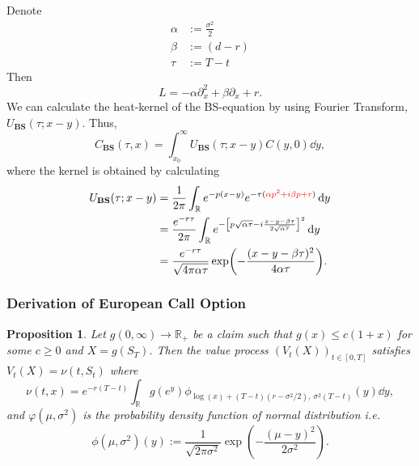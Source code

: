 \documentclass[10pt]{article}
\theoremstyle{remark}
\theoremstyle{plain}
\newtheorem{Proposition}{Proposition}[section]
\newcommand{\R}{\mathbb{R}}
\newcommand{\p}{\partial}
\numberwithin{equation}{section}
\renewcommand{\leq}{\leqslant}
\renewcommand{\geq}{\geqslant}
\begin{document}
Denote
\begin{align*}
	\alpha &:= \frac{\sigma^2}{2} \\
	\beta &:= (d-r)\\
	\tau &:= T-t
\end{align*}
Then
\[
	L = -\alpha \p_x^2 + \beta \p_x + r.
\]
We can calculate the heat-kernel of the BS-equation by using Fourier Transform, $U_{\textbf{BS}}(\tau; x - y)$. Thus, 
\[
C_{\textbf{BS}}(\tau, x) = \int_{x_0}^\infty U_{\textbf{BS}}(\tau; x - y)C(y, 0) \dd{y},
\]
where the kernel is obtained by calculating
\begin{align*}
	U_{\textbf{BS}}(\tau; x - y) &= \frac{1}{2\pi} \int_\R e^{-p(x-y)} e^{-\tau( {\color{red} \alpha p^2 + i\beta p + r} )} \dd{y}
	\\
	& = \frac{e^{-r\tau}}{2\pi} \int_\R e^{- \left[p\sqrt{\alpha \tau}  - i  \frac{x-y-\beta\tau}{2 \sqrt{\alpha\tau}}\right]^2 } \dd{y}
	\\
	& = \frac{e^{-r\tau}}{\sqrt{4\pi \alpha \tau}} \exp(-\frac{(x-y-\beta\tau)^2}{4\alpha\tau}) .
\end{align*}


\subsubsection{Derivation of European Call Option}

\begin{Proposition}\label{BS_0}
	Let $g(0,\infty) \to \R_+$ be a claim such that $g(x) \leq c(1+x)$ for some $c\geq 0$ and $X = g(S_T)$. Then the value process $(V_t(X))_{t\in[0,T]}$ satisfies $V_t(X) = \nu(t,S_t)$ where
	\begin{equation}\label{option_v}
		\nu(t,x) = e^{-r(T-t)} \int_\R g(e^y) \phi_{\log(x)+ (T-t)(r-\sigma^2/2),\ \sigma^2(T-t)} (y) \dd{y},
	\end{equation}
	and $\varphi(\mu, \sigma^2)$ is the probability density function of normal distribution i.e.
	\[
	\phi(\mu, \sigma^2)(y) := \frac{1}{\sqrt{2\pi \sigma^2}} \exp(-\frac{(\mu -y)^2}{2\sigma^2}).
	\]
\end{Proposition}
\end{document}
